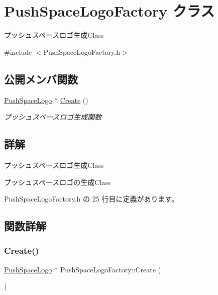 \hypertarget{class_push_space_logo_factory}{}\section{Push\+Space\+Logo\+Factory クラス}
\label{class_push_space_logo_factory}


プッシュスペースロゴ生成\+Class  




{\ttfamily \#include $<$Push\+Space\+Logo\+Factory.\+h$>$}

\subsection*{公開メンバ関数}
\begin{DoxyCompactItemize}
\item 
\mbox{\hyperlink{class_push_space_logo}{Push\+Space\+Logo}} $\ast$ \mbox{\hyperlink{class_push_space_logo_factory_a161a03ac90c35e092aa1cc45ffe7e74f}{Create}} ()
\begin{DoxyCompactList}\small\item\em プッシュスペースロゴ生成関数 \end{DoxyCompactList}\end{DoxyCompactItemize}


\subsection{詳解}
プッシュスペースロゴ生成\+Class 

プッシュスペースロゴの生成\+Class 

 Push\+Space\+Logo\+Factory.\+h の 25 行目に定義があります。



\subsection{関数詳解}
\mbox{\label{class_push_space_logo_factory_a161a03ac90c35e092aa1cc45ffe7e74f}} 
\subsubsection{\texorpdfstring{Create()}{Create()}}
{\footnotesize\ttfamily \mbox{\hyperlink{class_push_space_logo}{Push\+Space\+Logo}} $\ast$ Push\+Space\+Logo\+Factory\+::\+Create (\begin{DoxyParamCaption}{ }\end{DoxyParamCaption})}




